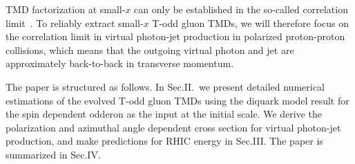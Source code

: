 \documentclass[prd,aps,preprintnumbers,fleqn,showpacs,nofootinbib,superscriptaddress]{revtex4}
\begin{document}
  
TMD factorization at  small-$x$  can only be established in the so-called correlation limit~\cite{Dominguez:2010xd,Dominguez:2011wm}. To reliably extract small-$x$ T-odd gluon TMDs, we will therefore focus on the correlation limit in virtual photon-jet production in polarized proton-proton collisions, which means that the outgoing virtual photon and jet are approximately back-to-back in transverse momentum. 
  
  The paper is structured as follows. In Sec.II.\ we present detailed numerical estimations of the evolved T-odd gluon TMDs using the diquark model result for the spin dependent odderon as the input at the initial scale. We derive the polarization and azimuthal angle dependent cross section for virtual photon-jet production, and make predictions for RHIC energy in Sec.III. The paper is summarized in Sec.IV.
\end{document}
